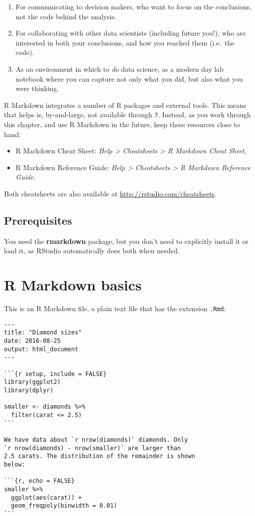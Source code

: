 \documentclass[]{book}
\begin{document}
\begin{enumerate}
\def\labelenumi{\arabic{enumi}.}
\item
  For communicating to decision makers, who want to focus on the
  conclusions, not the code behind the analysis.
\item
  For collaborating with other data scientists (including future you!),
  who are interested in both your conclusions, and how you reached them
  (i.e.~the code).
\item
  As an environment in which to \emph{do} data science, as a modern day
  lab notebook where you can capture not only what you did, but also
  what you were thinking.
\end{enumerate}

R Markdown integrates a number of R packages and external tools. This
means that helps is, by-and-large, not available through \texttt{?}.
Instead, as you work through this chapter, and use R Markdown in the
future, keep these resources close to hand:

\begin{itemize}
\item
  R Markdown Cheat Sheet: \emph{Help \textgreater{} Cheatsheets
  \textgreater{} R Markdown Cheat Sheet},
\item
  R Markdown Reference Guide: \emph{Help \textgreater{} Cheatsheets
  \textgreater{} R Markdown Reference Guide}.
\end{itemize}

Both cheatsheets are also available at
\url{http://rstudio.com/cheatsheets}.

\subsection{Prerequisites}\label{prerequisites-18}

You need the \textbf{rmarkdown} package, but you don't need to
explicitly install it or load it, as RStudio automatically does both
when needed.

\section{R Markdown basics}\label{r-markdown-basics}

This is an R Markdown file, a plain text file that has the extension
\texttt{.Rmd}:

\begin{verbatim}
---
title: "Diamond sizes"
date: 2016-08-25
output: html_document
---

```{r setup, include = FALSE}
library(ggplot2)
library(dplyr)

smaller <- diamonds %>% 
  filter(carat <= 2.5)
```

We have data about `r nrow(diamonds)` diamonds. Only 
`r nrow(diamonds) - nrow(smaller)` are larger than
2.5 carats. The distribution of the remainder is shown
below:

```{r, echo = FALSE}
smaller %>% 
  ggplot(aes(carat)) + 
  geom_freqpoly(binwidth = 0.01)
```
\end{verbatim}
\end{document}
